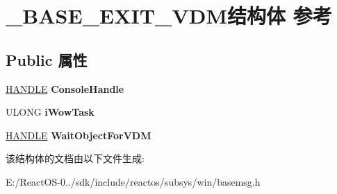 \hypertarget{struct___b_a_s_e___e_x_i_t___v_d_m}{}\section{\+\_\+\+B\+A\+S\+E\+\_\+\+E\+X\+I\+T\+\_\+\+V\+D\+M结构体 参考}
\label{struct___b_a_s_e___e_x_i_t___v_d_m}
\subsection*{Public 属性}
\begin{DoxyCompactItemize}
\item 
\mbox{\label{struct___b_a_s_e___e_x_i_t___v_d_m_ae94e289e8d8683232d9bd85636d38c47}} 
\hyperlink{interfacevoid}{H\+A\+N\+D\+LE} {\bfseries Console\+Handle}
\item 
\mbox{\label{struct___b_a_s_e___e_x_i_t___v_d_m_ab71a9a2da19de7bdea414dbea3e7f3af}} 
U\+L\+O\+NG {\bfseries i\+Wow\+Task}
\item 
\mbox{\label{struct___b_a_s_e___e_x_i_t___v_d_m_a2408401f82cb68a6b8fe9da953452a7d}} 
\hyperlink{interfacevoid}{H\+A\+N\+D\+LE} {\bfseries Wait\+Object\+For\+V\+DM}
\end{DoxyCompactItemize}


该结构体的文档由以下文件生成\+:\begin{DoxyCompactItemize}
\item 
E\+:/\+React\+O\+S-\/0../sdk/include/reactos/subsys/win/basemsg.\+h\end{DoxyCompactItemize}
